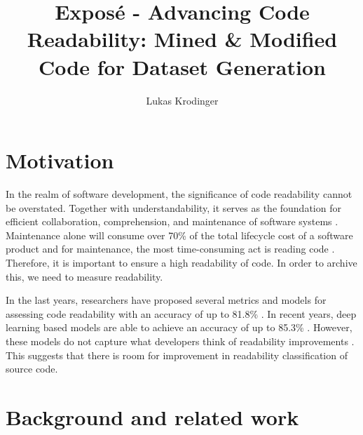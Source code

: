\documentclass[%
class=scrreprt,
chapterprefix=false,%
open=right,%
twoside=false,%
paper=a4,%
logofile={Logo\_zentral\_farbig\_EN.png},%
thesistype=masterproposal,%
UKenglish,%
]{se2thesis}
\author{Lukas Krodinger}
\title{Exposé - Advancing Code Readability: Mined \& Modified Code for Dataset Generation}
\institute{Chair of Software Engineering II}
\begin{document}
	
	\frontmatter
	
	\maketitle
	
	\mainmatter
	
	\section{Motivation} \label{Motivation}
	
	
	In the realm of software development, the significance of code readability cannot be overstated. Together with understandability, it 	serves as the foundation for efficient collaboration, comprehension, and maintenance of software systems \cite{posnett2011simpler, aggarwal2002integrated}. 
	Maintenance alone will consume over 70\% of the total lifecycle cost of a software product and for maintenance, the most time-consuming act is reading code \cite{buse2009learning, deimel1985uses, rugaber2000use, boehm2001defect}.
	Therefore, it is important to ensure a high readability of code. In order to archive this, we need to measure readability.
	
	In the last years, researchers have proposed several metrics and models for assessing code readability with an accuracy of up to 81.8\% \cite{buse2009learning, posnett2011simpler, dorn2012general, daka2015modeling}. In recent years, deep learning based models are able to achieve an accuracy of up to 85.3\% \cite{mi2018improving, mi2022towards}.
	However, these models do not capture what developers think of readability improvements \cite{fakhoury2019improving}. This suggests that there is room for improvement in readability classification of source code.
	
	\section{Background and related work} \label{Background and related work}
	
\end{document}
